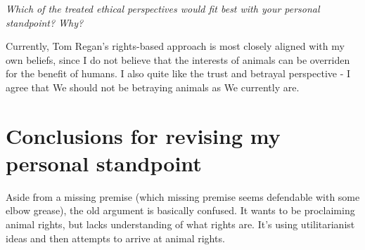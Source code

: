 \documentclass{article}
\begin{document}
			\textit{Which of the treated ethical perspectives would fit best with your personal standpoint? Why?}
			
			Currently, Tom Regan's rights-based approach is most closely aligned with my own beliefs, since I do not believe that the interests of animals can be overriden for the benefit of humans. I also quite like the trust and  betrayal perspective - I agree that We should not be betraying animals as We currently are.
			
	\section{Conclusions for revising my personal standpoint}
	
		Aside from a missing premise (which missing premise seems defendable with some elbow grease), the old argument is basically confused. It wants to be proclaiming animal rights, but lacks understanding of what rights are. It's using utilitarianist ideas and then attempts to arrive at animal rights.


	
\end{document}

